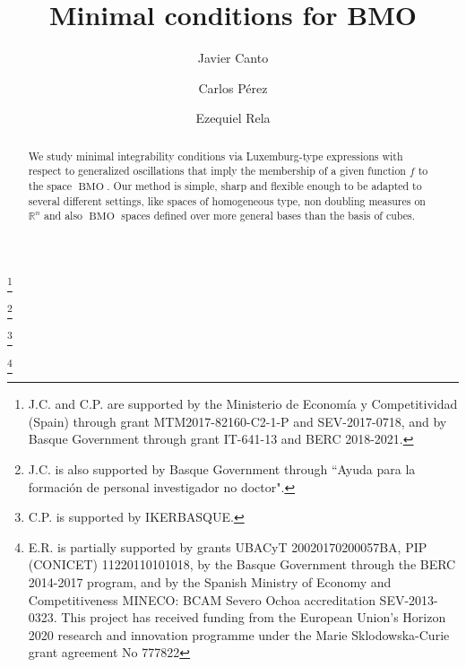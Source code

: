 \documentclass[11pt,a4paper]{amsart}
\theoremstyle{definition}
\theoremstyle{remark}
\numberwithin{equation}{section}
\DeclareMathOperator{\BMO}{BMO}
\def\R{{\mathbb R}}
\numberwithin{equation}{section}
\begin{document}
\title[Minimal BMO]{Minimal conditions for BMO}

\author{Javier Canto}
\address[Javier Canto]{ BCAM \textendash  Basque Center for Applied Mathematics, Bilbao, Spain}

\author{Carlos P\'erez}
\address[Carlos P\'erez]{ Department of Mathematics, University of the Basque Country, IKERBASQUE 
(Basque Foundation for Science) and
BCAM \textendash  Basque Center for Applied Mathematics, Bilbao, Spain}


\author{Ezequiel Rela}
\address[Ezequiel Rela]{Department of Mathematics,
Facultad de Ciencias Exactas y Naturales,
University of Buenos Aires, Ciudad Universitaria
Pabell\'on I, Buenos Aires 1428 Capital Federal Argentina} 



\thanks{ J.C. and C.P. are supported by the Ministerio de Econom\'ia y Competitividad (Spain) through grant MTM2017-82160-C2-1-P and SEV-2017-0718, and by Basque Government through grant IT-641-13 and BERC 2018-2021. }

\thanks{J.C. is also supported by Basque Government through ``Ayuda para la formaci\'on de personal investigador no doctor".}

\thanks{C.P. is supported by IKERBASQUE.}


\thanks{E.R. is partially supported by grants UBACyT 20020170200057BA, PIP (CONICET) 11220110101018, by the Basque Government through the BERC 2014-2017 program, and by the Spanish Ministry of Economy and Competitiveness MINECO: BCAM Severo Ochoa accreditation SEV-2013-0323. This project has received funding from the European Union's Horizon 2020 research and innovation programme under the Marie Sklodowska-Curie grant agreement No 777822}





\begin{abstract}
We study minimal integrability conditions via Luxemburg-type expressions  with respect to generalized oscillations that imply the membership of a given function $f$ to the space $\BMO$. Our method is simple, sharp and flexible enough to be adapted to several different settings, like spaces of homogeneous type, non doubling measures on $\R^n$ and also $\BMO$ spaces defined over more general bases than the basis of cubes.
\end{abstract}
\end{document}
